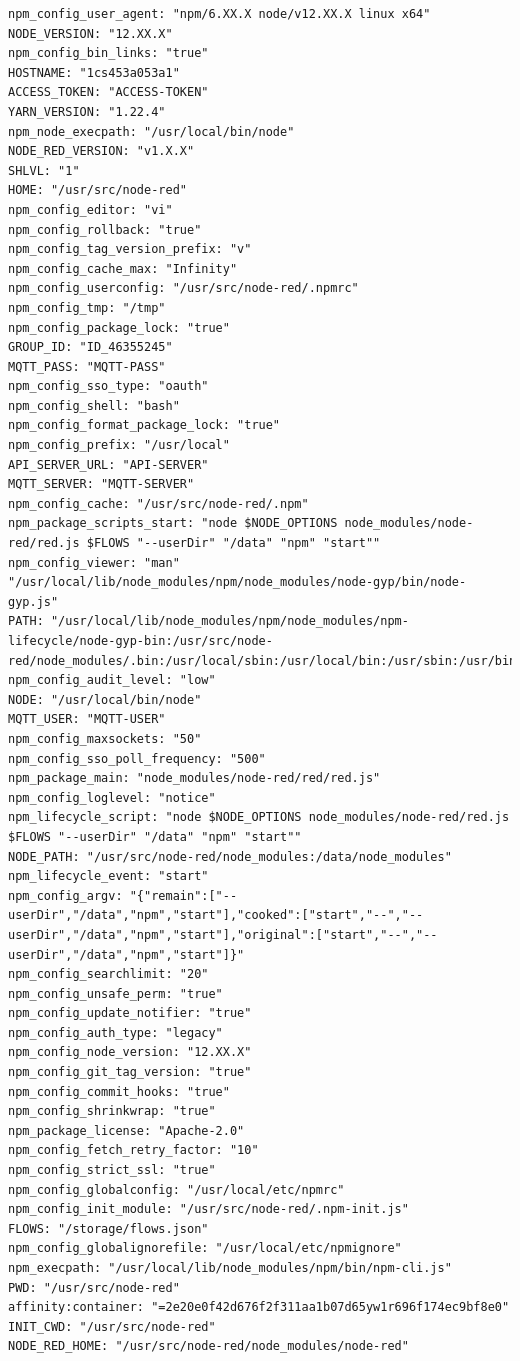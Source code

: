\documentclass[a4paper,10pt]{memoir}
\begin{document}
\begin{lstlisting}
npm_config_user_agent: "npm/6.XX.X node/v12.XX.X linux x64"
NODE_VERSION: "12.XX.X"
npm_config_bin_links: "true"
HOSTNAME: "1cs453a053a1"
ACCESS_TOKEN: "ACCESS-TOKEN"
YARN_VERSION: "1.22.4"
npm_node_execpath: "/usr/local/bin/node"
NODE_RED_VERSION: "v1.X.X"
SHLVL: "1"
HOME: "/usr/src/node-red"
npm_config_editor: "vi"
npm_config_rollback: "true"
npm_config_tag_version_prefix: "v"
npm_config_cache_max: "Infinity"
npm_config_userconfig: "/usr/src/node-red/.npmrc"
npm_config_tmp: "/tmp"
npm_config_package_lock: "true"
GROUP_ID: "ID_46355245"
MQTT_PASS: "MQTT-PASS"
npm_config_sso_type: "oauth"
npm_config_shell: "bash"
npm_config_format_package_lock: "true"
npm_config_prefix: "/usr/local"
API_SERVER_URL: "API-SERVER"
MQTT_SERVER: "MQTT-SERVER"
npm_config_cache: "/usr/src/node-red/.npm"
npm_package_scripts_start: "node $NODE_OPTIONS node_modules/node-red/red.js $FLOWS "--userDir" "/data" "npm" "start""
npm_config_viewer: "man" "/usr/local/lib/node_modules/npm/node_modules/node-gyp/bin/node-gyp.js"
PATH: "/usr/local/lib/node_modules/npm/node_modules/npm-lifecycle/node-gyp-bin:/usr/src/node-red/node_modules/.bin:/usr/local/sbin:/usr/local/bin:/usr/sbin:/usr/bin:/sbin:/bin"
npm_config_audit_level: "low"
NODE: "/usr/local/bin/node"
MQTT_USER: "MQTT-USER"
npm_config_maxsockets: "50"
npm_config_sso_poll_frequency: "500"
npm_package_main: "node_modules/node-red/red/red.js"
npm_config_loglevel: "notice"
npm_lifecycle_script: "node $NODE_OPTIONS node_modules/node-red/red.js $FLOWS "--userDir" "/data" "npm" "start""
NODE_PATH: "/usr/src/node-red/node_modules:/data/node_modules"
npm_lifecycle_event: "start"
npm_config_argv: "{"remain":["--userDir","/data","npm","start"],"cooked":["start","--","--userDir","/data","npm","start"],"original":["start","--","--userDir","/data","npm","start"]}"
npm_config_searchlimit: "20"
npm_config_unsafe_perm: "true"
npm_config_update_notifier: "true"
npm_config_auth_type: "legacy"
npm_config_node_version: "12.XX.X"
npm_config_git_tag_version: "true"
npm_config_commit_hooks: "true"
npm_config_shrinkwrap: "true"
npm_package_license: "Apache-2.0"
npm_config_fetch_retry_factor: "10"
npm_config_strict_ssl: "true"
npm_config_globalconfig: "/usr/local/etc/npmrc"
npm_config_init_module: "/usr/src/node-red/.npm-init.js"
FLOWS: "/storage/flows.json"
npm_config_globalignorefile: "/usr/local/etc/npmignore"
npm_execpath: "/usr/local/lib/node_modules/npm/bin/npm-cli.js"
PWD: "/usr/src/node-red"
affinity:container: "=2e20e0f42d676f2f311aa1b07d65yw1r696f174ec9bf8e0"
INIT_CWD: "/usr/src/node-red"
NODE_RED_HOME: "/usr/src/node-red/node_modules/node-red"
\end{lstlisting}
\end{document}

